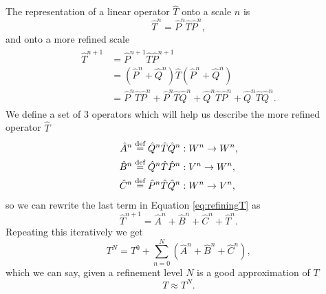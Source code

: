 \documentclass[../Thesis.tex]{subfiles}
\begin{document}
The representation of a linear operator $\hat{T}$ onto a scale $n$ is
\begin{equation}\label{eq:PTP}
  \hat{T}^n = \hat{P}^n\hat{T}\hat{P}^n,
\end{equation}
and onto a more refined scale
\begin{align}\label{eq:refiningT}
  \begin{split}
    \hat{T}^{n+1} &= \hat{P}^{n+1}\hat{T}\hat{P}^{n+1}\\
                  &= (\hat{P}^n + \hat{Q}^n)\hat{T}(\hat{P}^n + \hat{Q}^n)\\
                  &= \hat{P}^n\hat{T}\hat{P}^n + \hat{P}^n\hat{T}\hat{Q}^n + \hat{Q}^n\hat{T}\hat{P}^n + \hat{Q}^n\hat{T}\hat{Q}^n.
  \end{split}
\end{align}
We define a set of 3 operators which will help us describe the more refined operator
$\hat{T}$
\begin{align}
  \hat{A}^n & \stackrel{\text{def}}{=}\hat{Q}^n\hat{T}\hat{Q}^n: W^n \to W^n,\\
  \hat{B}^n & \stackrel{\text{def}}{=}\hat{Q}^n\hat{T}\hat{P}^n: V^n \to W^n,\\
  \hat{C}^n & \stackrel{\text{def}}{=}\hat{P}^n\hat{T}\hat{Q}^n: W^n \to V^n,
\end{align}
so we can rewrite the last term in Equation \ref{eq:refiningT} as
\begin{equation}\label{eq:refineT}
  \hat{T}^{n+1} =\hat{A}^n + \hat{B}^n + \hat{C}^n + \hat{T}^n.
\end{equation}
Repeating this iteratively we get
\begin{equation}\label{eq:}
  T^N = T^0 + \sum^N_{n=0}\left( \hat{A}^n + \hat{B}^n + \hat{C}^n\right),
\end{equation}
which we can say, given a refinement level $N$ is a good approximation of $T$
\begin{equation}
  T \approx T^N.
\end{equation}
\end{document}

